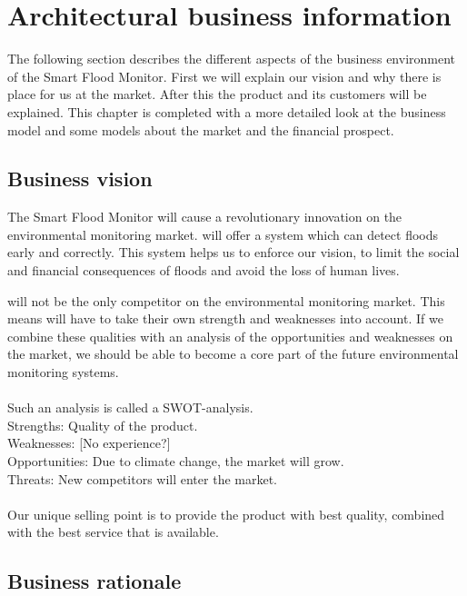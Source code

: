 \chapter{Architectural business information}
\label{ch:business}
The following section describes the different aspects of the business environment of the Smart Flood Monitor. First we will explain our vision and why there is place for us at the market. After this the product and its customers will be explained. This chapter is completed with a more detailed look at the business model and some models about the market and the financial prospect.

\section{Business vision}
The Smart Flood Monitor will cause a revolutionary innovation on the environmental monitoring market. \CompanyName will offer a system which can detect floods early and correctly. This system helps us to enforce our vision, to limit the social and financial consequences of floods and avoid the loss of human lives. 

\CompanyName will not be the only competitor on the environmental monitoring market. This means \CompanyName will have to take their own strength and weaknesses into account. If we combine these qualities with an analysis of the opportunities and weaknesses on the market, we should be able to become a core part of the future environmental monitoring systems.\\\\

Such an analysis is called a SWOT-analysis. 
\\
Strengths: Quality of the product.\\ 
Weaknesses: [No experience?]\\
Opportunities: Due to climate change, the market will grow. \\
Threats: New competitors will enter the market.\\\\

Our unique selling point is to provide the product with best quality, combined with the best service that is available.

\section{Business rationale}

